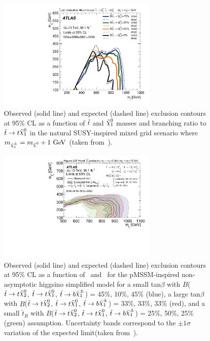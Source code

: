 			\begin{figure}[htpb]
			  \begin{center}
			    \includegraphics[width=0.7\textwidth]{figures/fit/SRABCD_mixed_dm1}
			    \caption{Observed (solid line) and expected (dashed line) exclusion contours at 95\% CL as a function of $\tilde{t}$ and $\ninoone$ masses and branching ratio to $\stop\to t\LSP$ in the natural SUSY-inspired mixed grid scenario where $m_{\chinoonepm}=\mLSP+1\gev$ (taken from~\cite{stop0L}).}
			    \label{fig:tbMet_exclusion}
			  \end{center}
			\end{figure}


			\begin{figure}[htpb]
			  \begin{center}
			   \includegraphics[width=0.7\textwidth]{figures/fit/SRABCD_tN1tN2bC1.pdf}
			    \caption{Observed (solid line) and expected (dashed line) exclusion contours at 95\% CL as a function of \mstop\ and \mLSP\ for the pMSSM-inspired non-asymptotic higgsino simplified model for a small tan$\beta$ with $B$($\stop\to t\ninotwo$, $\stop\to t\LSP$, $\stop\to b\chinoonepm$) = 45\%, 10\%, 45\% (blue), a large tan$\beta$ with $B$($\stop\to t\ninotwo$, $\stop\to t\LSP$, $\stop\to b\chinoonepm$) = 33\%, 33\%, 33\% (red), and a small $\tilde t_{R}$ with $B$($\stop\to t\ninotwo$, $\stop\to t\LSP$, $\stop\to b\chinoonepm$) = 25\%, 50\%, 25\% (green) assumption. Uncertainty bands correspond to the $\pm 1 \sigma$ variation of the expected limit(taken from~\cite{stop0L}).}
			    \label{fig:nonAsymhiggsino_exclusion}
			  \end{center}
			\end{figure}


